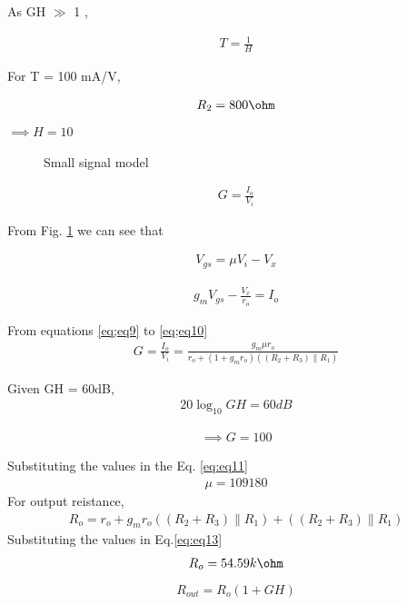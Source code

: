 \begin{enumerate}[label=\arabic*.,ref=\theenumi]
As GH $\gg$ 1 ,

\begin{align}
    T = \frac{1}{H}
    \label{eq:eq6}
\end{align}

For T = 100 mA/V,

\begin{align}
    R_2 = 800 \ohm
    \label{eq:eq7}
\end{align}
$\implies H=10$


\begin{figure}[!ht]
	\begin{center}
		\resizebox{\columnwidth}{!}{}
	\end{center}
\caption{Small signal model}
\label{fig:fig3}
\end{figure}


\begin{align}
    G = \frac{I_o}{V_i} 
    \label{eq;eq8}
\end{align}

From Fig. \ref{fig:fig3} we can see that
 
\begin{align}
    V_{gs} = \mu V_i - V_x
    \label{eq;eq9}
\end{align}

\begin{align}
    g_mV_{gs} - \frac{V_x}{r_o} = I_o
    \label{eq;eq10}
\end{align}

From equations \ref{eq;eq9} to \ref{eq;eq10}
\begin{align}
    G = \frac{I_o}{V_i} = \frac{g_m \mu r_o}{r_o + (1+g_m r_o)((R_2+R_3)\|R_1) }
    \label{eq:eq11}
\end{align}

Given GH = 60dB,
\begin{align}
    20\log_{10} GH = 60 dB
    \label{eq:eq12}
\end{align}

\begin{align}
\implies G=100
\end{align}

Substituting the values in the Eq. \ref{eq:eq11}
\begin{align}
    \mu = 109180
\end{align}
For output reistance,
\begin{align}
    R_o = r_o + g_m r_o((R_2+R_3)\|R_1) + ((R_2+R_3)\|R_1)    
    \label{eq:eq13}
\end{align}
Substituting the values in Eq.\ref{eq:eq13} 
\begin{align}
    R_o=54.59k\ohm
\end{align}
\begin{align}
R_{out} = R_o(1+GH)    
\end{align}


\end{enumerate}

